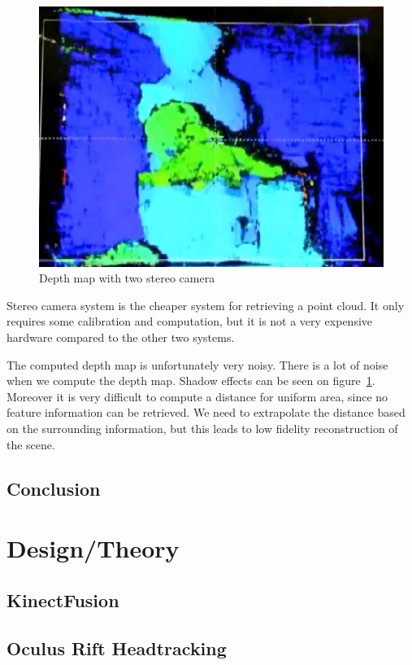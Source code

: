 \documentclass[12pt]{article}
\begin{document}
\begin{figure}[h]
  \centering
  \includegraphics[scale=0.3]{EtronDepth.png}
  \caption{\label{etron} Depth map with two stereo camera}
\end{figure}

Stereo camera system is the cheaper system for retrieving a point cloud. It only requires some calibration and computation, but it is not a very expensive hardware compared to the other two systems.

The computed depth map is unfortunately very noisy. There is a lot of noise when we compute the depth map. Shadow effects can be seen on figure~\ref{etron}. Moreover it is very difficult to compute a distance for uniform area, since no feature information can be retrieved. We need to extrapolate the distance based  on the surrounding information, but this leads to low fidelity reconstruction of the scene.

\subsection{Conclusion}


\section{Design/Theory}
\subsection{KinectFusion}

\subsection{Oculus Rift Headtracking}
\end{document}
